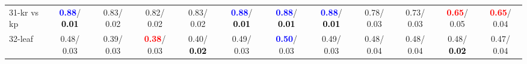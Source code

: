 \begin{table}[h]
\begin{center}
{\begin{tabular}{lc|c|c|c|c|c|c|c|c|c|c}
31-kr vs kp & \textcolor{blue}{\textbf{  0.88}}/\textcolor{black}{\textbf{  0.01}} &   0.83/  0.02 &   0.82/  0.02 &   0.83/  0.02 & \textcolor{blue}{\textbf{  0.88}}/\textcolor{black}{\textbf{  0.01}} & \textcolor{blue}{\textbf{  0.88}}/\textcolor{black}{\textbf{  0.01}} & \textcolor{blue}{\textbf{  0.88}}/\textcolor{black}{\textbf{  0.01}} &   0.78/  0.03 &   0.73/  0.03 & \textcolor{red}{\textbf{  0.65}}/  0.05 & \textcolor{red}{\textbf{  0.65}}/  0.04 \\
32-leaf &   0.48/  0.03 &   0.39/  0.03 & \textcolor{red}{\textbf{  0.38}}/  0.03 &   0.40/\textcolor{black}{\textbf{  0.02}} &   0.49/  0.03 & \textcolor{blue}{\textbf{  0.50}}/  0.03 &   0.49/  0.03 &   0.48/  0.04 &   0.48/  0.04 &   0.48/\textcolor{black}{\textbf{  0.02}} &   0.47/  0.04 \\\end{tabular}
}\label{strats0bNB}
\end{center}
\end{table}
